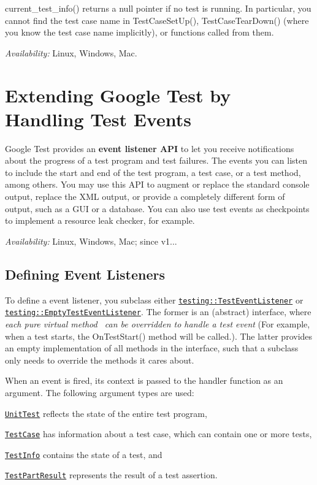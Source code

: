 {\ttfamily current\+\_\+test\+\_\+info()} returns a null pointer if no test is running. In particular, you cannot find the test case name in {\ttfamily Test\+Case\+Set\+Up()}, {\ttfamily Test\+Case\+Tear\+Down()} (where you know the test case name implicitly), or functions called from them.

{\itshape Availability\+:} Linux, Windows, Mac.

\section*{Extending Google Test by Handling Test Events}

Google Test provides an {\bfseries event listener A\+PI} to let you receive notifications about the progress of a test program and test failures. The events you can listen to include the start and end of the test program, a test case, or a test method, among others. You may use this A\+PI to augment or replace the standard console output, replace the X\+ML output, or provide a completely different form of output, such as a G\+UI or a database. You can also use test events as checkpoints to implement a resource leak checker, for example.

{\itshape Availability\+:} Linux, Windows, Mac; since v1...

\subsection*{Defining Event Listeners}

To define a event listener, you subclass either \href{../include/gtest/gtest.h#L855}{\tt testing\+::\+Test\+Event\+Listener} or \href{../include/gtest/gtest.h#L905}{\tt testing\+::\+Empty\+Test\+Event\+Listener}. The former is an (abstract) interface, where {\itshape each pure virtual method~\newline
 can be overridden to handle a test event} (For example, when a test starts, the {\ttfamily On\+Test\+Start()} method will be called.). The latter provides an empty implementation of all methods in the interface, such that a subclass only needs to override the methods it cares about.

When an event is fired, its context is passed to the handler function as an argument. The following argument types are used\+:
\begin{DoxyItemize}
\item \href{../include/gtest/gtest.h#L1007}{\tt Unit\+Test} reflects the state of the entire test program,
\item \href{../include/gtest/gtest.h#L689}{\tt Test\+Case} has information about a test case, which can contain one or more tests,
\item \href{../include/gtest/gtest.h#L599}{\tt Test\+Info} contains the state of a test, and
\item \href{../include/gtest/gtest-test-part.h#L42}{\tt Test\+Part\+Result} represents the result of a test assertion.
\end{DoxyItemize}

